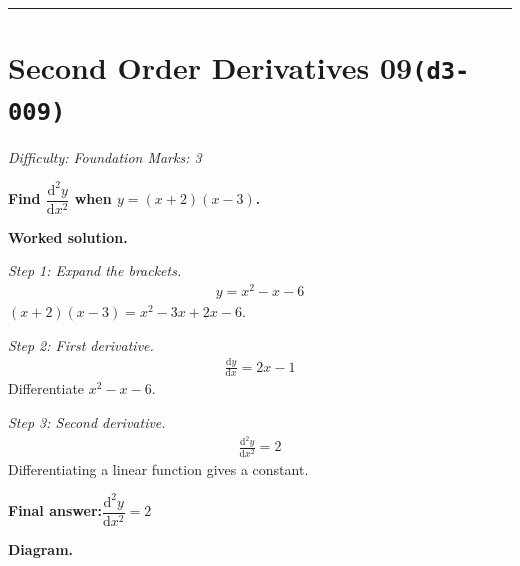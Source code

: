 \documentclass[11pt]{article}
\newcommand{\question}[1]{\par\medskip\noindent\textbf{#1}\par}
\begin{document}
\medskip\hrule

\section*{Second Order Derivatives 09\quad\small\texttt{(d3-009)}}
\textit{Difficulty: Foundation \quad\textbar\quad Marks: 3}

\question{Find \( \dfrac{\mathrm{d}^2y}{\mathrm{d}x^2} \) when \( y = (x + 2)(x - 3) \).}

\textbf{Worked solution.}

\textit{Step 1: Expand the brackets.}
\[\begin{gathered}
y = x^2 - x - 6
\end{gathered}\]
\( (x+2)(x-3) = x^2 - 3x + 2x - 6 \).

\textit{Step 2: First derivative.}
\[\begin{gathered}
\frac{\mathrm{d}y}{\mathrm{d}x} = 2x - 1
\end{gathered}\]
Differentiate \(x^2 - x - 6\).

\textit{Step 3: Second derivative.}
\[\begin{gathered}
\frac{\mathrm{d}^2y}{\mathrm{d}x^2} = 2
\end{gathered}\]
Differentiating a linear function gives a constant.

\begin{answerbox}
\textbf{Final answer:}\quad \(\displaystyle  \dfrac{\mathrm{d}^2y}{\mathrm{d}x^2} = 2 \)
\end{answerbox}
\textbf{Diagram.}
\end{document}
